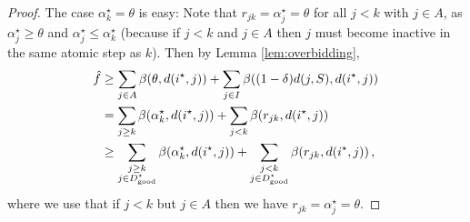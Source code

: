 \begin{proof}
    The case $\alpha_k^\star = \theta$ is easy:
    Note that $r_{jk} = \alpha_j^\star = \theta$ for all $j < k$ with $j \in A$, as $\alpha_j^\star \geq \theta$ and $\alpha_j^\star \leq \alpha_k^\star$ (because if $j < k$ and $j \in A$ then $j$ must become inactive in the same atomic step as $k$).
    Then by Lemma \ref{lem:overbidding},
    \begin{align*}
        \hat f & \ge \sum_{j \in A} \beta(\theta, d(i^\star,j)) + \sum_{j \in I} \beta((1-\delta)d(j, S), d(i^\star,j)) 
        \\ & = \sum_{j \ge k} \beta(\alpha^\star_k, d(i^\star,j)) + \sum_{j < k} \beta(r_{jk}, d(i^\star,j)) 
        \\ & \ge \sum_{\substack{j \ge k\\ j \in D^\star_{\mathrm{good}}}} \beta(\alpha^\star_k, d(i^\star,j)) + \sum_{\substack{j < k\\ j \in D^\star_{\mathrm{good}}}} \beta(r_{jk}, d(i^\star,j))\,,
    \end{align*}
    where we use that if $j < k$ but $j \in A$ then we have $r_{jk} = \alpha_j^\star = \theta$.
    

\end{proof}
